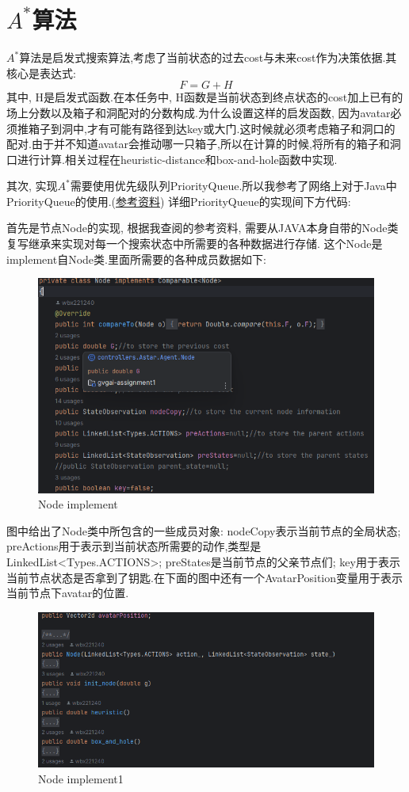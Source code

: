 \documentclass{article}
\begin{document}
\newpage
\section{$A^{*}$算法}
$A^{*}$算法是启发式搜索算法,考虑了当前状态的过去cost与未来cost作为决策依据.其核心是表达式:$$F=G+H$$
其中, H是启发式函数.在本任务中, H函数是当前状态到终点状态的cost加上已有的场上分数以及箱子和洞配对的分数构成.为什么设置这样的启发函数, 因为avatar必须推箱子到洞中,才有可能有路径到达key或大门.这时候就必须考虑箱子和洞口的配对.由于并不知道avatar会推动哪一只箱子,所以在计算的时候,将所有的箱子和洞口进行计算.相关过程在heuristic-distance和box-and-hole函数中实现.

其次, 实现$A^{*}$需要使用优先级队列PriorityQueue.所以我参考了网络上对于Java中PriorityQueue的使用.(\href{https://blog.csdn.net/qq\_45978890/article/details/115802114?ops\_request\_misc=\%257B\%2522request\%255Fid\%2522\%253A\%2522169608481316800184148350\%2522\%252C\%2522scm\%2522\%253A\%252220140713.130102334..\%2522\%257D\&request\_id=169608481316800184148350\&biz\_id=0\&utm_medium=distribute.pc_search_result.none-task-blog-2~all~sobaiduend~default-1-115802114-null-null.142^v94^insert\_down28v1\&utm_term=Java\%20Astar\&spm=1018.2226.3001.4187}{参考资料})
详细PriorityQueue的实现间下方代码:

 首先是节点Node的实现, 根据我查阅的参考资料, 需要从JAVA本身自带的Node类复写继承来实现对每一个搜索状态中所需要的各种数据进行存储. 这个Node是implement自Node类.里面所需要的各种成员数据如下:
\begin{figure}[h]
\centering
\includegraphics[width=0.5\linewidth]{Node}
\caption{Node implement}
\end{figure}

图中给出了Node类中所包含的一些成员对象: nodeCopy表示当前节点的全局状态; preActions用于表示到当前状态所需要的动作,类型是LinkedList<Types.ACTIONS>; preStates是当前节点的父亲节点们; key用于表示当前节点状态是否拿到了钥匙.在下面的图中还有一个AvatarPosition变量用于表示当前节点下avatar的位置.
\begin{figure}[h]
\centering
\includegraphics[width=0.5\linewidth]{Node1}
\caption{Node implement1}
\end{figure}
\end{document}
